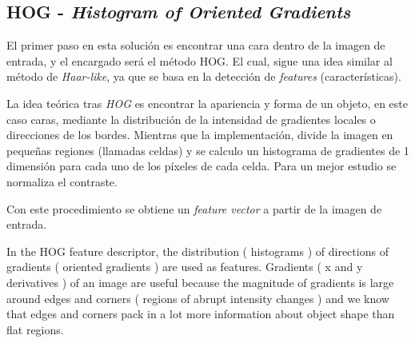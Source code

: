 \subsection*{HOG - \textit{Histogram of Oriented Gradients}}

El primer paso en esta solución es encontrar una cara dentro de la imagen de entrada, y el encargado será el método HOG. El cual, sigue una idea similar al método de \textit{Haar-like}, ya que se basa en la detección de \textit{features} (características).

La idea teórica tras \textit{HOG} es encontrar la apariencia y forma de un objeto, en este caso caras, mediante la distribución de la intensidad de gradientes locales o direcciones de los bordes. Mientras que la implementación, divide la imagen en pequeñas regiones (llamadas celdas) y se calculo un histograma de gradientes de 1 dimensión para cada uno de los píxeles de cada celda. Para un mejor estudio se normaliza el contraste. \cite{hog}

Con este procedimiento se obtiene un \textit{feature vector} a partir de la imagen de entrada.

In the HOG feature descriptor, the distribution ( histograms ) of directions of gradients ( oriented gradients ) are used as features. Gradients ( x and y derivatives ) of an image are useful because the magnitude of gradients is large around edges and corners ( regions of abrupt intensity changes ) and we know that edges and corners pack in a lot more information about object shape than flat regions.

